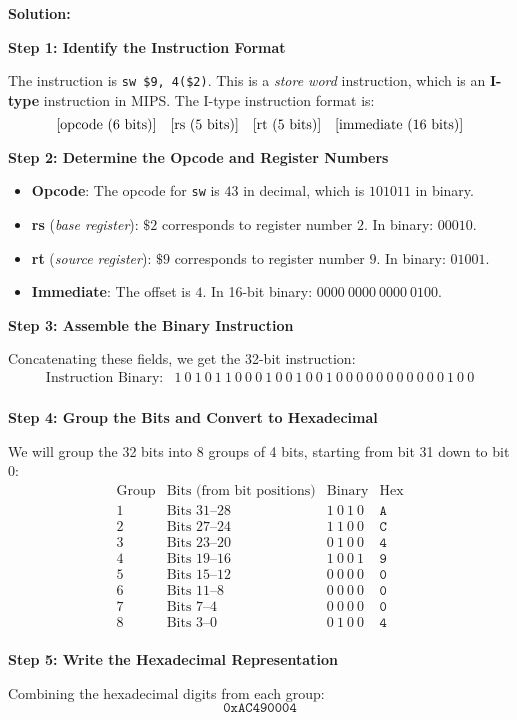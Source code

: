 \textbf{Solution:}

\textbf{Step 1: Identify the Instruction Format}

The instruction is \texttt{sw \$9, 4(\$2)}. This is a \emph{store word} instruction, which is an \textbf{I-type} instruction in MIPS. The I-type instruction format is:
\[
\text{[opcode (6 bits)]\quad[rs (5 bits)]\quad[rt (5 bits)]\quad[immediate (16 bits)]}
\]

\textbf{Step 2: Determine the Opcode and Register Numbers}

\begin{itemize}
    \item \textbf{Opcode}: The opcode for \texttt{sw} is \(43\) in decimal, which is \(101011\) in binary.\cite{MIPS32}
    \item \textbf{rs} (\emph{base register}): \(\$2\) corresponds to register number \(2\). In binary: \(00010\).
    \item \textbf{rt} (\emph{source register}): \(\$9\) corresponds to register number \(9\). In binary: \(01001\).
    \item \textbf{Immediate}: The offset is \(4\). In 16-bit binary: \(0000\ 0000\ 0000\ 0100\).
\end{itemize}

\textbf{Step 3: Assemble the Binary Instruction}

Concatenating these fields, we get the 32-bit instruction:
\[
\begin{array}{rl}
\text{Instruction Binary}: & 1\ 0\ 1\ 0\ 1\ 1\ 0\ 0\ 0\ 1\ 0\ 0\ 1\ 0\ 0\ 1\ 0\ 0\ 0\ 0\ 0\ 0\ 0\ 0\ 0\ 0\ 0\ 1\ 0\ 0 \\
\end{array}
\]

\textbf{Step 4: Group the Bits and Convert to Hexadecimal}

We will group the 32 bits into 8 groups of 4 bits, starting from bit 31 down to bit 0:
\[
\begin{array}{llcl}
\text{Group} & \text{Bits (from bit positions)} & \text{Binary} & \text{Hex} \\
\hline
\text{1} & \text{Bits 31--28} & 1\ 0\ 1\ 0 & \texttt{A} \\
\text{2} & \text{Bits 27--24} & 1\ 1\ 0\ 0 & \texttt{C} \\
\text{3} & \text{Bits 23--20} & 0\ 1\ 0\ 0 & \texttt{4} \\
\text{4} & \text{Bits 19--16} & 1\ 0\ 0\ 1 & \texttt{9} \\
\text{5} & \text{Bits 15--12} & 0\ 0\ 0\ 0 & \texttt{0} \\
\text{6} & \text{Bits 11--8} & 0\ 0\ 0\ 0 & \texttt{0} \\
\text{7} & \text{Bits 7--4} & 0\ 0\ 0\ 0 & \texttt{0} \\
\text{8} & \text{Bits 3--0} & 0\ 1\ 0\ 0 & \texttt{4} \\
\end{array}
\]

\textbf{Step 5: Write the Hexadecimal Representation}

Combining the hexadecimal digits from each group:
\[
\boxed{\texttt{0xAC490004}}
\]

